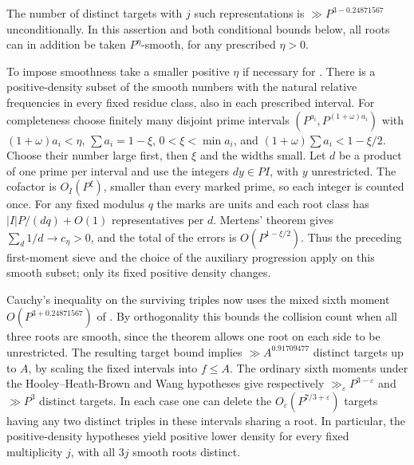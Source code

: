\documentclass[11pt,letterpaper]{article}
\theoremstyle{definition}
\begin{document}
The number of distinct targets with $j$ such representations is
$\gg P^{3-0.24871567}$ unconditionally. In this assertion and
both conditional bounds below, all roots can in addition be taken
$P^\eta$-smooth, for any prescribed $\eta>0$.

To impose smoothness take a smaller positive $\eta$ if necessary
for \cite[Theorem 1.2]{c3:wooley}. There is a positive-density
subset of the smooth numbers with the natural relative frequencies
in every fixed residue class, also in each prescribed interval.
For completeness choose finitely many disjoint prime intervals
$(P^{a_i},P^{(1+\omega)a_i})$ with $(1+\omega)a_i<\eta$,
$\sum a_i=1-\xi$, $0<\xi<\min a_i$, and
$(1+\omega)\sum a_i<1-\xi/2$. Choose their number large first,
then $\xi$ and the widths small. Let $d$ be a product of one
prime per interval and use the integers $dy\in PI$, with $y$
unrestricted. The cofactor is $O_I(P^\xi)$, smaller than every
marked prime, so each integer is counted once. For any fixed
modulus $q$ the marks are units and each root class has
$|I|P/(dq)+O(1)$ representatives per $d$. Mertens' theorem gives
$\sum_d1/d\to c_\eta>0$, and the total of the errors is
$O(P^{1-\xi/2})$. Thus the preceding first-moment sieve and the
choice of the auxiliary progression apply on this smooth subset;
only its fixed positive density changes.

Cauchy's inequality on the surviving triples now uses the mixed
sixth moment $O(P^{3+0.24871567})$ of
\cite[Theorem 1.2]{c3:wooley}. By orthogonality this bounds
the collision count when all three roots are smooth, since the
theorem allows one root on each side to be unrestricted.
The resulting target bound implies $\gg A^{0.91709477}$ distinct
targets up to $A$, by scaling the fixed intervals into $f\le A$.
The ordinary sixth moments under the Hooley--Heath-Brown and
Wang hypotheses give respectively $\gg_\varepsilon P^{3-\varepsilon}$
and $\gg P^3$ distinct targets. In each case one can delete
the $O_\varepsilon(P^{7/3+\varepsilon})$ targets having any two
distinct triples in these intervals sharing a root. In particular,
the positive-density hypotheses yield positive lower density for
every fixed multiplicity $j$, with all $3j$ smooth roots distinct.
\end{document}
